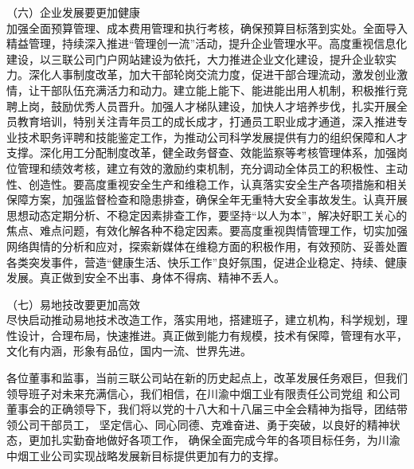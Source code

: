 （六）企业发展要更加健康\\
\indent
加强全面预算管理、成本费用管理和执行考核，确保预算目标落到实处。全面导入精益管理，持续深入推进“管理创一流”活动，提升企业管理水平。高度重视信息化建设，以三联公司门户网站建设为依托，大力推进企业文化建设，提升企业软实力。深化人事制度改革，加大干部轮岗交流力度，促进干部合理流动，激发创业激情，让干部队伍充满活力和动力。建立能上能下、能进能出用人机制，积极推行竞聘上岗，鼓励优秀人员晋升。加强人才梯队建设，加快人才培养步伐，扎实开展全员教育培训，特别关注青年员工的成长成才，打通员工职业成才通道，深入推进专业技术职务评聘和技能鉴定工作，为推动公司科学发展提供有力的组织保障和人才支撑。深化用工分配制度改革，健全政务督查、效能监察等考核管理体系，加强岗位管理和绩效考核，建立有效的激励约束机制，充分调动全体员工的积极性、主动性、创造性。要高度重视安全生产和维稳工作，认真落实安全生产各项措施和相关保障方案，加强监督检查和隐患排查，确保全年无重特大安全事故发生。认真开展思想动态定期分析、不稳定因素排查工作，要坚持“以人为本”，解决好职工关心的焦点、难点问题，有效化解各种不稳定因素。要高度重视舆情管理工作，切实加强网络舆情的分析和应对，探索新媒体在维稳方面的积极作用，有效预防、妥善处置各类突发事件，营造“健康生活、快乐工作”良好氛围，促进企业稳定、持续、健康发展。真正做到安全不出事、身体不得病、精神不丢人。


（七）易地技改要更加高效\\
\indent
尽快启动推动易地技术改造工作，落实用地，搭建班子，建立机构，科学规划，理性设计，合理布局，快速推进。真正做到能力有规模，技术有保障，管理有水平，文化有内涵，形象有品位，国内一流、世界先进。


\indent
各位董事和监事，当前三联公司站在新的历史起点上，改革发展任务艰巨，但我们领导班子对未来充满信心，我们相信，在川渝中烟工业有限责任公司党组
和公司董事会的正确领导下，我们将以党的十八大和十八届三中全会精神为指导，团结带领公司干部员工，
坚定信心、同心同德、克难奋进、勇于突破，以良好的精神状态，更加扎实勤奋地做好各项工作，
确保全面完成今年的各项目标任务，为川渝中烟工业公司实现战略发展新目标提供更加有力的支撑。


